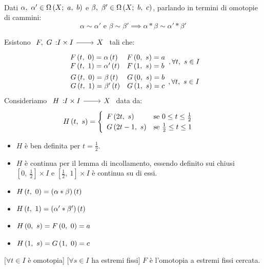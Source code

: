 \begin{lemming}~{}\label{compoomotopecammini}\\
Dati $\alpha,\ \alpha'\in\inscam{X}{a}{b}$ e $\beta,\ \beta '\in\inscam{X}{b}{c}$, parlando in termini di omotopie di cammini:
	\begin{equation}
		\alpha\sim \alpha'\text{ e }\beta\sim \beta'\implies \alpha\ast\beta\sim\alpha'\ast\beta'
	\end{equation}
\vspace{-6mm}
\end{lemming}
\begin{demonstration}
	Esistono $\funz{F,\ G}{I\times I}{X}$ tali che:
	\begin{gather*}
		\begin{array}{ll}
			F\left(t,\ 0\right)=\alpha\left(t\right)&F\left(0,\ s\right)=a\\
			F\left(t,\ 1\right)=\alpha'\left(t\right)&F\left(1,\ s\right)=b
		\end{array}
	,\forall t,\ s\in I\\
		\begin{array}{ll}
	G\left(t,\ 0\right)=\beta\left(t\right)&G\left(0,\ s\right)=b\\
	G\left(t,\ 1\right)=\beta'\left(t\right)&G\left(1,\ s\right)=c
\end{array}	
	,\forall t,\ s\in I
	\end{gather*}
Consideriamo $\funz{H}{I\times I}{X}$ data da:
\begin{equation*}
	H\left(t,\ s\right)=\begin{cases}
				\begin{array}{lc}
			F\left(2t,\ s\right) & \text{se }0\leq t\leq \frac{1}{2}\\
			G\left(2t-1,\ s\right) & \text{se }\frac{1}{2}\leq t\leq 1	
		\end{array}
	\end{cases}
\end{equation*}
\begin{itemize}
	\item $H$ è ben definita per $t=\frac{1}{2}$.
	\item $H$ è continua per il lemma di incollamento, essendo definito sui chiusi $\left[0,\ \frac{1}{2}\right]\times I$ e $\left[\frac{1}{2},\ 1\right]\times I$ è continua su di essi.
\item \parbox[t]{0.25\textwidth}{$H\left(t,\ 0\right)=\left(\alpha\ast\beta\right)\left(t\right)$}
\item \parbox[t]{0.25\textwidth}{$\mvf{H}{t}{1}=\left(\alpha'\ast\beta'\right)\left(t\right)\ $}
\item \parbox[t]{0.25\textwidth}{$H\left(0,\ s\right)=F\left(0,\ 0\right)=a$}
\item \parbox[t]{0.25\textwidth}{$H\left(1,\ s\right)=G\left(1,\ 0\right)=c$}
\end{itemize}
[$\forall t\in I$ è omotopia]
[$\forall s\in I$ ha estremi fissi]
$F$ è l'omotopia a estremi fissi cercata.
\end{demonstration}
